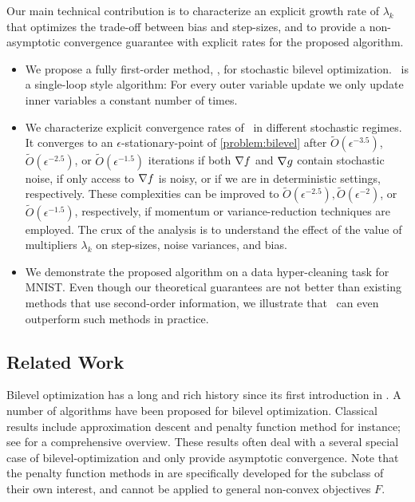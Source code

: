 Our main technical contribution is to characterize an explicit growth rate of $\lambda_k$ that optimizes the trade-off between bias and step-sizes, and to provide a non-asymptotic convergence guarantee with explicit rates for the proposed algorithm. 
\begin{itemize}
    \item We propose a fully first-order method, \algname, for stochastic bilevel optimization. \algname~is a single-loop style algorithm: For every outer variable update we only update inner variables a constant number of times. 
    \item We characterize explicit convergence rates of \algname~in different stochastic regimes. 
    It converges to an $\epsilon$-stationary-point of \eqref{problem:bilevel} after $\tilde{O} (\epsilon^{-3.5})$, $\tilde{O}(\epsilon^{-2.5})$, or $\tilde{O}(\epsilon^{-1.5})$ iterations if both $\nabla f$ and $\nabla g$ contain stochastic noise, if only access to $\nabla f$ is noisy, or if we are in deterministic settings, respectively. 
    These complexities can be improved to $\tilde{O}(\epsilon^{-2.5}), \tilde{O}(\epsilon^{-2})$, or $\tilde{O}(\epsilon^{-1.5})$, respectively, if momentum or variance-reduction techniques are employed. 
    The crux of the analysis is to understand the effect of the value of multipliers $\lambda_k$ on step-sizes, noise variances, and bias. 
    \item We demonstrate the proposed algorithm on a data hyper-cleaning task for MNIST. 
    Even though our theoretical guarantees are not better than existing methods that use second-order information, we illustrate that \algname~can even outperform such methods in practice. 
\end{itemize}






\subsection{Related Work}
\label{section:related_work}


Bilevel optimization has a long and rich history since its first introduction in \cite{bracken1973mathematical}. A number of algorithms have been proposed for bilevel optimization. Classical results include approximation descent \cite{vicente1994descent} and penalty function method \cite{ishizuka1992double, anandalingam1990solution, white1993penalty} for instance; see \cite{colson2007overview} for a comprehensive overview. These results often deal with a several special case of bilevel-optimization and only provide asymptotic convergence. Note that the penalty function methods in \cite{ishizuka1992double, anandalingam1990solution, white1993penalty} are specifically developed for the subclass of their own interest, and cannot be applied to general non-convex objectives $F$.




